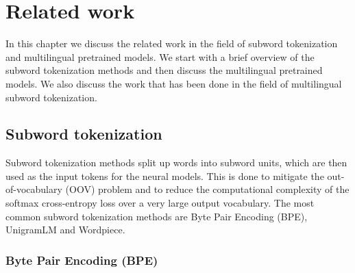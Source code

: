 



\chapter{Related work}
\label{chap:related_work}

In this chapter we discuss the related work in the field of subword tokenization and multilingual pretrained models. We start with a brief overview of the subword tokenization methods and then discuss the multilingual pretrained models. We also discuss the work that has been done in the field of multilingual subword tokenization.

\section{Subword tokenization}

Subword tokenization methods split up words into subword units, which are then used as the input tokens for the neural models. This is done to mitigate the out-of-vocabulary (OOV) problem and to reduce the computational complexity of the softmax cross-entropy loss over a very large output vocabulary. The most common subword tokenization methods are Byte Pair Encoding (BPE), UnigramLM and Wordpiece.

\subsection{Byte Pair Encoding (BPE)}

